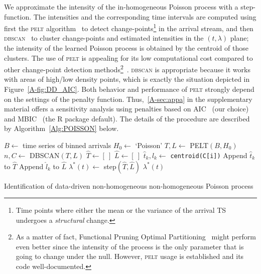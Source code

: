 \documentclass[draft,review]{elsarticle}
\newcommand{\PELT}{\textsc{pelt}}
\newcommand{\DBSCAN}{\textsc{dbscan}}
\begin{document}
We approximate the intensity of the in-homogeneous Poisson process with a step-function.
The intensities and the corresponding time intervals are computed using first the \PELT{} algorithm~\citep{killick2012optimal} to detect change-points\footnote{Time points where either the mean or the variance of the arrival \ac{TS} undergoes a \emph{structural} change.} in the arrival stream, and then \DBSCAN{}~\citep{ester1996density,pedregosa2011scikit} to cluster change-points and estimated intensities in the \((t, \lambda)\) plane; the intensity of the learned Poisson process is obtained by the centroid of those clusters.
The use of \PELT{} is appealing for its low computational cost compared to other change-point detection methods\footnote{As a matter of fact, Functional Pruning Optimal Partitioning~\citep{maidstone2017} might perform even better since the intensity of the process is the only parameter that is going to change under the null.
However, \PELT{} usage is established and its code well-documented.}~\citep{killick2012optimal}.
\DBSCAN{} is appropriate because it works with areas of high/low density points, which is exactly the situation depicted in Figure~\ref{A-fig:DD_AIC}.
Both behavior and performance of \PELT{} strongly depend on the settings of the penalty function.
Thus,~\ref{A-sec:appa} in the supplementary material offers a sensitivity analysis using penalties based on  \ac{AIC}~\citep{akaike1973information} (our choice) and \ac{MBIC}~\citep{zhang2007modified} (the R package default).
The details of the procedure are described by Algorithm~\ref{Alg:POISSON} below.


\begin{algorithm}
\begin{algorithmic}[1]
    \STATE \(B \leftarrow \) time series of binned arrivals
    \STATE \(H_0 \leftarrow \) `Poisson'
    \STATE \(T, L \leftarrow \) PELT\((B, H_0)\)
    \STATE \(n, C \leftarrow \) DBSCAN\((T, L)\)
    \STATE {}
    \STATE \(\hat{T} \leftarrow [~] \)
    \STATE \(\hat{L} \leftarrow [~] \)
        \STATE \(\hat{t}_k, \hat{l}_k \leftarrow \) \texttt{centroid(C[i])}
        \STATE Append \(\hat{t}_k\) to \(\hat{T}\)
        \STATE Append \(\hat{l}_k\) to \(\hat{L}\)
    \ENDFOR
    \STATE \(\lambda^\ast(t) \leftarrow \) step\((\hat{T}, \hat{L})\)
    \RETURN \(\lambda^\ast(t)\)
\end{algorithmic}
\caption{Identification of data-driven non-homogeneous non-homogeneous Poisson process}\label{Alg:POISSON}
\end{algorithm}
\end{document}
